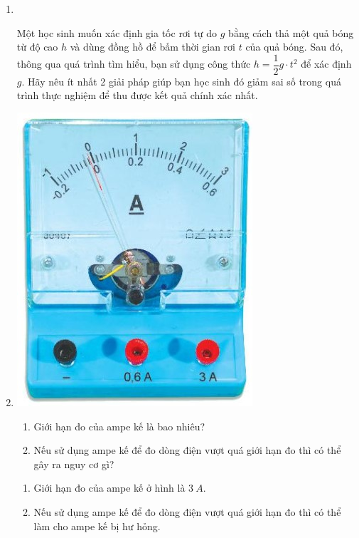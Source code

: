 \begin{enumerate}[label=\bfseries Bài \arabic*:,leftmargin=1.5cm]
{}
	
	\item {}\\
	{Một học sinh muốn xác định gia tốc rơi tự do $g$ bằng cách thả một quả bóng từ độ cao $h$ và dùng đồng hồ để bấm thời gian rơi $t$ của quả bóng. Sau đó, thông qua quá trình tìm hiểu, bạn sử dụng công thức $h=\dfrac{1}{2}g\cdot t^2$ để xác định $g$. Hãy nêu ít nhất 2 giải pháp giúp bạn học sinh đó giảm sai số trong quá trình thực nghiệm để thu được kết quả chính xác nhất.
	
}

\item {}


{
	\begin{center}
		\includegraphics[scale=0.6]{../figs/VN10-2022-PH-TP003-6.jpg}
	\end{center}
	\begin{enumerate}[label=\alph*)]
		\item Giới hạn đo của ampe kế là bao nhiêu?
		\item Nếu sử dụng ampe kế để đo dòng điện vượt quá giới hạn đo thì có thể gây ra nguy cơ gì?
	\end{enumerate}
}

\hideall
{	
	\begin{enumerate}[label=\alph*)]
		\item Giới hạn đo của ampe kế ở hình là $\SI{3}{A}$.
		\item Nếu sử dụng ampe kế để đo dòng điện vượt quá giới hạn đo thì có thể làm cho ampe kế bị hư hỏng.
	\end{enumerate}
}




\end{enumerate}
